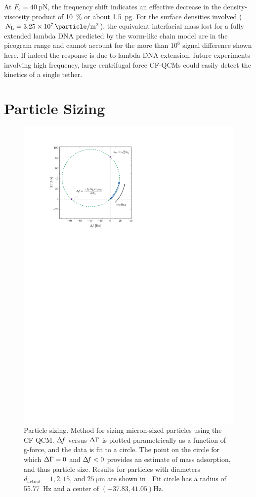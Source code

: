 At $F_\mathrm{c}=\SI{40}{\pico\newton}$, the frequency shift indicates an
effective decrease in the density-viscosity product of \SI{10}{\percent} or
about \SI{1.5}{\pico\gram}.  For the surface densities involved
($N_\mathrm{L}=\SI{3.25e7}{\particle\per\meter\squared}$), the equivalent
interfacial mass lost for a fully extended lambda DNA predicted by the
worm-like chain model are in the picogram range and cannot account for the
more than $10^6$ signal difference shown here.  If indeed the response is
due to lambda DNA extension, future experiments involving high frequency,
large centrifugal force CF-QCMs could easily detect the kinetics of a
single tether.

\section{Particle Sizing}
\begin{figure}[ht]
\centering
\includegraphics{qcm/figures/figure4.pdf}
\caption{ Particle sizing.  Method for sizing micron-sized particles using the CF-QCM. 
$\Delta\!f$ versus $\Delta\Gamma$ is plotted parametrically as a function of g-force, and
the data is fit to a circle.  The point on the circle for which $\Delta\Gamma=0$ and
$\Delta\!f<0$ provides an estimate of mass adsorption, and thus particle size.
Results for particles with diameters $\bar{d}_\mathrm{actual}=1, 2,
15,\,\mathrm{and}\;\SI{25}{\micro\meter}$ are shown in
.  Fit circle has a radius of \SI{55.77}{\hertz} and
a center of $(-37.83,41.05) \si{\hertz}$. }
\label{fig:circlefit}
\end{figure}


